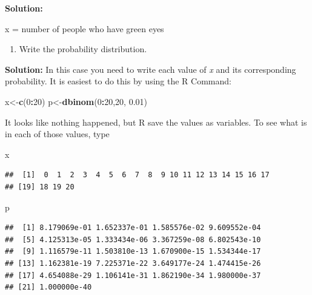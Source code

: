 \documentclass[
]{book}
\newenvironment{Shaded}{\begin{snugshade}}{\end{snugshade}}
\newcommand{\DecValTok}[1]{\textcolor[rgb]{0.00,0.00,0.81}{#1}}
\newcommand{\FloatTok}[1]{\textcolor[rgb]{0.00,0.00,0.81}{#1}}
\newcommand{\KeywordTok}[1]{\textcolor[rgb]{0.13,0.29,0.53}{\textbf{#1}}}
\newcommand{\NormalTok}[1]{#1}
\newcommand{\OperatorTok}[1]{\textcolor[rgb]{0.81,0.36,0.00}{\textbf{#1}}}
\providecommand{\tightlist}{%
  \setlength{\itemsep}{0pt}\setlength{\parskip}{0pt}}
\begin{document}
\textbf{Solution:}

x = number of people who have green eyes

\begin{enumerate}
\def\labelenumi{\alph{enumi}.}
\setcounter{enumi}{1}
\tightlist
\item
  Write the probability distribution.
\end{enumerate}

\textbf{Solution:}
In this case you need to write each value of \emph{x} and its corresponding probability. It is easiest to do this by using the R Command:

\begin{Shaded}
\begin{Highlighting}[]
\NormalTok{x<-}\KeywordTok{c}\NormalTok{(}\DecValTok{0}\OperatorTok{:}\DecValTok{20}\NormalTok{)}
\NormalTok{p<-}\KeywordTok{dbinom}\NormalTok{(}\DecValTok{0}\OperatorTok{:}\DecValTok{20}\NormalTok{,}\DecValTok{20}\NormalTok{, }\FloatTok{0.01}\NormalTok{)}
\end{Highlighting}
\end{Shaded}

It looks like nothing happened, but R save the values as variables. To see what is in each of those values, type

\begin{Shaded}
\begin{Highlighting}[]
\NormalTok{x}
\end{Highlighting}
\end{Shaded}

\begin{verbatim}
##  [1]  0  1  2  3  4  5  6  7  8  9 10 11 12 13 14 15 16 17
## [19] 18 19 20
\end{verbatim}

\begin{Shaded}
\begin{Highlighting}[]
\NormalTok{p}
\end{Highlighting}
\end{Shaded}

\begin{verbatim}
##  [1] 8.179069e-01 1.652337e-01 1.585576e-02 9.609552e-04
##  [5] 4.125313e-05 1.333434e-06 3.367259e-08 6.802543e-10
##  [9] 1.116579e-11 1.503810e-13 1.670900e-15 1.534344e-17
## [13] 1.162381e-19 7.225371e-22 3.649177e-24 1.474415e-26
## [17] 4.654088e-29 1.106141e-31 1.862190e-34 1.980000e-37
## [21] 1.000000e-40
\end{verbatim}
\end{document}
